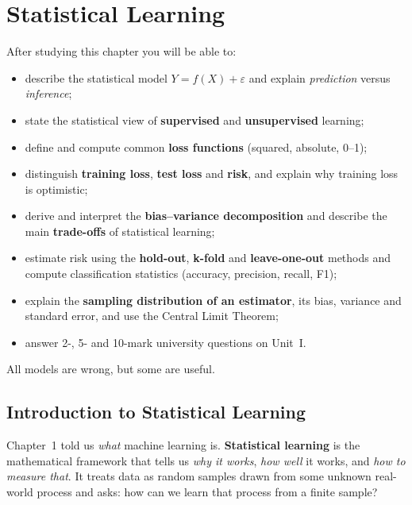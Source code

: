 \chapter{Statistical Learning}
\label{ch:stat}
\begin{objectives}
After studying this chapter you will be able to:
\begin{itemize}
  \item describe the statistical model $Y=f(X)+\varepsilon$ and explain \emph{prediction} versus \emph{inference};
  \item state the statistical view of \textbf{supervised} and \textbf{unsupervised} learning;
  \item define and compute common \textbf{loss functions} (squared, absolute, 0--1);
  \item distinguish \textbf{training loss}, \textbf{test loss} and \textbf{risk}, and explain why training loss is optimistic;
  \item derive and interpret the \textbf{bias--variance decomposition} and describe the main \textbf{trade-offs} of statistical learning;
  \item estimate risk using the \textbf{hold-out}, \textbf{k-fold} and \textbf{leave-one-out} methods and compute classification statistics (accuracy, precision, recall, F1);
  \item explain the \textbf{sampling distribution of an estimator}, its bias, variance and standard error, and use the Central Limit Theorem;
  \item answer 2-, 5- and 10-mark university questions on Unit~I.
\end{itemize}
\end{objectives}

\begin{pullquote}
All models are wrong, but some are useful.
\end{pullquote}

\section{Introduction to Statistical Learning}

Chapter~1 told us \emph{what} machine learning is. \textbf{Statistical learning} is the mathematical framework that tells us \emph{why it works}, \emph{how well} it works, and \emph{how to measure that}. It treats data as random samples drawn from some unknown real-world process and asks: how can we learn that process from a finite sample?

